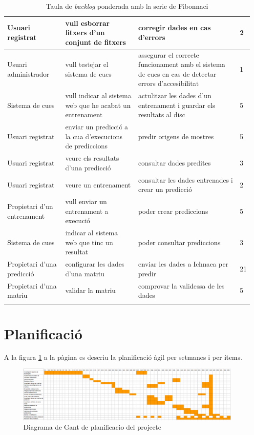 \begin{center}
\begin{longtable}{ | p{3cm} | p{5cm} | p{5cm} | p{1cm} | }
Usuari registrat & vull esborrar fitxers d'un conjunt de fitxers & corregir dades en cas d'errors & 2 \\ \hline
Usuari administrador & vull testejar el sistema de cues & assegurar el correcte funcionament amb el sistema de cues en cas de detectar errors d'accesibilitat & 1 \\ \hline
Sistema de cues & vull indicar al sistema web que he acabat un entrenament & actulitzar les dades d'un entrenament i guardar els resultats al disc & 5 \\ \hline
Usuari registrat & enviar un predicció a la cua d'execucions de prediccions & predir origens de mostres & 5  \\ \hline
Usuari registrat & veure els resultats d'una predicció & consultar dades predites & 3  \\ \hline
Usuari registrat & veure un entrenament & consultar les dades entrenades i crear un predicció & 2  \\ \hline
Propietari d'un entrenament & vull enviar un entrenament a execució & poder crear prediccions & 5  \\ \hline
Sistema de cues & indicar al sistema web que tinc un resultat & poder consultar prediccions & 3  \\ \hline
Propietari d'una predicció & configurar les dades d'una matriu	& enviar les dades a Ichnaea per predir & 21  \\ \hline
Propietari d'una matriu & validar la matriu	 & comprovar la validessa de les dades & 5  \\ \hline
\caption{Taula de \textit{backlog} ponderada amb la serie de Fibonnaci}
\label{table:backlog}
\end{longtable}
\end{center}

\section{Planificació}
A la figura \ref{fig:gant} a la p\`{a}gina \pageref{fig:gant} es descriu la planificació àgil per setmanes i per ítems.\\
\begin{figure}
    \includegraphics[scale=0.5]{img/conclussions/gantz.png}
    \caption{Diagrama de Gant de planificacio del projecte}
    \label{fig:gant}
\end{figure}

